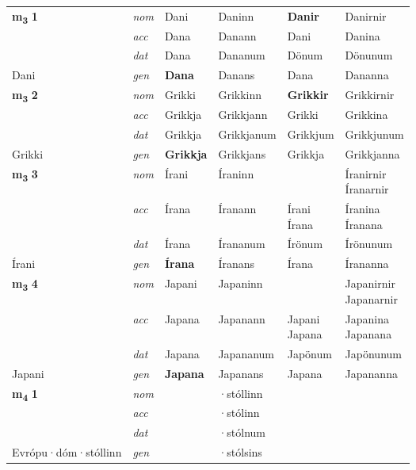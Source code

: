 \begin{longtable}[l]{X>{\footnotesize\itshape}XXXXX}
\multirow{3}{*}{{{\textbf{m{\textsubscript{3}}} \Large{\textbf{1}}}}} & nom & Dani & Daninn & \textbf{Danir} & Danirnir \\*
 & acc & Dana & Danann & Dani & Danina \\*
 & dat & Dana & Dananum & Dönum & Dönunum \\*
 {\footnotesize{Dani}} & gen & \textbf{Dana} & Danans & Dana & Dananna \\
\midrule

\multirow{3}{*}{{{\textbf{m{\textsubscript{3}}} \Large{\textbf{2}}}}} & nom & Grikki & Grikkinn & \textbf{Grikkir} & Grikkirnir \\*
 & acc & Grikkja & Grikkjann & Grikki & Grikkina \\*
 & dat & Grikkja & Grikkjanum & Grikkjum & Grikkjunum \\*
 {\footnotesize{Grikki}} & gen & \textbf{Grikkja} & Grikkjans & Grikkja & Grikkjanna \\
\midrule

\multirow{3}{*}{{{\textbf{m{\textsubscript{3}}} \Large{\textbf{3}}}}} & nom & Írani & Íraninn & \textbf{\specialcell{Íranir\\ Íranar}} & \specialcell{Íranirnir\\ Íranarnir} \\*
 & acc & Írana & Íranann & \specialcell{Írani\\ Írana} & \specialcell{Íranina\\ Íranana} \\*
 & dat & Írana & Írananum & Írönum & Írönunum \\*
 {\footnotesize{Írani}} & gen & \textbf{Írana} & Íranans & Írana & Írananna \\
\midrule

\multirow{3}{*}{{{\textbf{m{\textsubscript{3}}} \Large{\textbf{4}}}}} & nom & Japani & Japaninn & \textbf{\specialcell{Japanir\\ Japanar}} & \specialcell{Japanirnir\\ Japanarnir} \\*
 & acc & Japana & Japanann & \specialcell{Japani\\ Japana} & \specialcell{Japanina\\ Japanana} \\*
 & dat & Japana & Japananum & Japönum & Japönunum \\*
 {\footnotesize{Japani}} & gen & \textbf{Japana} & Japanans & Japana & Japananna \\
\midrule

\multirow{3}{*}{{{\textbf{m{\textsubscript{4}}} \Large{\textbf{1}}}}} & nom &  & ·stóllinn & \textbf{} &  \\*
 & acc &  & ·stólinn &  &  \\*
 & dat &  & ·stólnum &  &  \\*
 {\footnotesize{Evrópu\allowbreak ·dóm\allowbreak ·stóllinn}} & gen & \textbf{} & ·stólsins &  &  \\
\midrule


\end{longtable}
